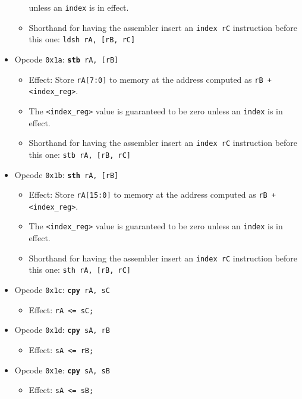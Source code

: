 \documentclass{article}
\begin{document}
\begin{itemize}
\begin{itemize}
		unless an \texttt{index} is in effect.
		\item Shorthand for having the assembler insert an
		\texttt{index rC} instruction before this one:
			\texttt{ldsh rA, [rB, rC]}
		\end{itemize}
	\item Opcode \texttt{0x1a}:
		\texttt{\textbf{stb} rA, [rB]}
		\begin{itemize}
		\item Effect: Store \texttt{rA[7:0]} to memory at the address
		computed as \texttt{rB + <index\_reg>}.
		\item The \texttt{<index\_reg>} value is guaranteed to be zero
		unless an \texttt{index} is in effect.
		\item Shorthand for having the assembler insert an
		\texttt{index rC} instruction before this one:
			\texttt{stb rA, [rB, rC]}
		\end{itemize}
	\item Opcode \texttt{0x1b}:
		\texttt{\textbf{sth} rA, [rB]}
		\begin{itemize}
		\item Effect: Store \texttt{rA[15:0]} to memory at the address
		computed as \texttt{rB + <index\_reg>}.
		\item The \texttt{<index\_reg>} value is guaranteed to be zero
		unless an \texttt{index} is in effect.
		\item Shorthand for having the assembler insert an
		\texttt{index rC} instruction before this one:
			\texttt{sth rA, [rB, rC]}
		\end{itemize}
	\item Opcode \texttt{0x1c}:
		\texttt{\textbf{cpy} rA, sC}
		\begin{itemize}
		\item Effect: \texttt{rA <= sC;}
		\end{itemize}
	\item Opcode \texttt{0x1d}:
		\texttt{\textbf{cpy} sA, rB}
		\begin{itemize}
		\item Effect: \texttt{sA <= rB;}
		\end{itemize}
	\item Opcode \texttt{0x1e}:
		\texttt{\textbf{cpy} sA, sB}
		\begin{itemize}
		\item Effect: \texttt{sA <= sB;}
		\end{itemize}
	\end{itemize}
\end{document}
